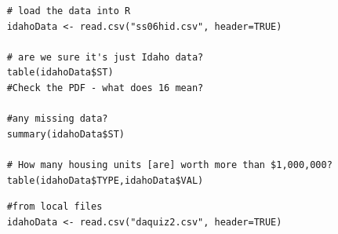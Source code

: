 \documentclass{beamer}
\begin{document}

\begin{frame}[fragile]

\begin{framed}
	\begin{verbatim}	
	# load the data into R
	idahoData <- read.csv("ss06hid.csv", header=TRUE)
	
	# are we sure it's just Idaho data?
	table(idahoData$ST)
	#Check the PDF - what does 16 mean?
	
	#any missing data?
	summary(idahoData$ST)
	
	# How many housing units [are] worth more than $1,000,000?
	table(idahoData$TYPE,idahoData$VAL)
	\end{verbatim}
\end{framed}

\end{frame}


\begin{frame}[fragile]

\begin{framed}
	\begin{verbatim}
	#from local files
	idahoData <- read.csv("daquiz2.csv", header=TRUE)
	
	\end{verbatim}
\end{framed}

\end{frame}

\end{document}
